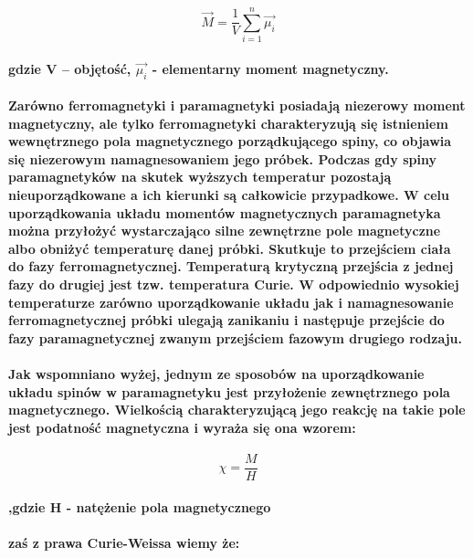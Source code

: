 \documentclass[a4paper,10pt]{article}
\begin{document}
\begin{equation}
\vec{M} =\frac{1}{V} \sum_{i=1}^n \vec{\mu_i}
\end{equation}
\paragraph{gdzie V – objętość, $\vec{\mu_i}$ - elementarny moment magnetyczny.}

\paragraph{Zarówno ferromagnetyki i paramagnetyki posiadają niezerowy moment magnetyczny, ale  tylko ferromagnetyki charakteryzują się istnieniem wewnętrznego pola magnetycznego porządkującego spiny, co objawia się niezerowym namagnesowaniem jego próbek. Podczas gdy spiny paramagnetyków na skutek wyższych temperatur pozostają nieuporządkowane a ich kierunki są całkowicie przypadkowe. W celu uporządkowania układu momentów magnetycznych paramagnetyka można przyłożyć wystarczająco silne zewnętrzne pole magnetyczne albo obniżyć temperaturę danej próbki. Skutkuje to przejściem ciała do fazy ferromagnetycznej. Temperaturą krytyczną przejścia z jednej fazy do drugiej jest tzw. temperatura Curie. W odpowiednio wysokiej temperaturze zarówno uporządkowanie układu jak i namagnesowanie ferromagnetycznej próbki ulegają zanikaniu i następuje przejście do fazy paramagnetycznej zwanym przejściem fazowym drugiego rodzaju.}

\paragraph{Jak wspomniano wyżej, jednym ze sposobów na uporządkowanie układu spinów w paramagnetyku jest przyłożenie zewnętrznego pola magnetycznego. Wielkością charakteryzującą jego reakcję na takie pole jest podatność magnetyczna i wyraża się ona wzorem:}

\begin{equation}
\chi = \frac{M}{H}
\end{equation}

\paragraph{,gdzie H - natężenie pola magnetycznego}

\paragraph{zaś z prawa Curie-Weissa wiemy że:}
\end{document}

